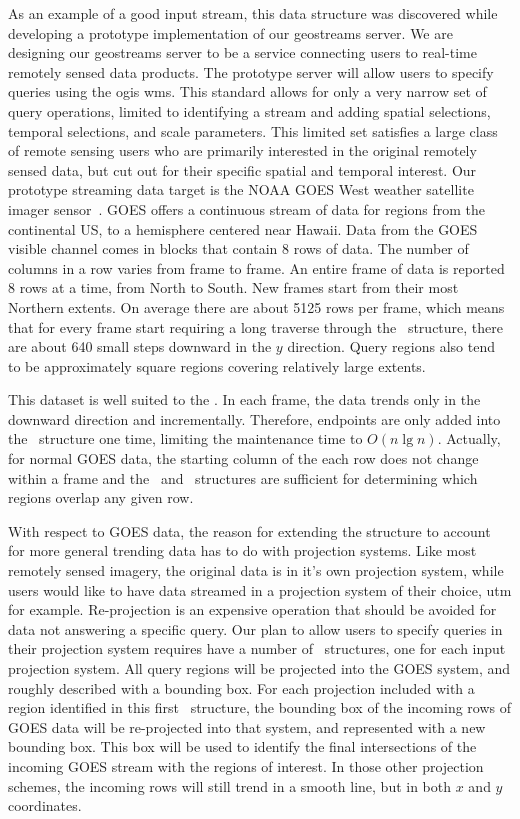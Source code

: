\documentclass{sig-alternate}
\newcommand{\ct}{\id{DCT}}
\newcommand{\inC}[1]{{\id{DCT_{#1}}}}
\newcommand{\X}{{\inC{X}}}
\newcommand{\Y}{{\inC{Y}}}
\newcommand{\A}{{\inC{A}}}
\begin{document}
As an example of a good input stream, this data structure was
discovered while developing a prototype implementation of our
geostreams server.  We are designing our geostreams server to be a
service connecting users to real-time remotely sensed data products.
The prototype server will allow users to specify queries using the
\ac{ogis} \acl{wms}.  This standard allows for only a very narrow set
of query operations, limited to identifying a stream and adding
spatial selections, temporal selections, and scale parameters. This
limited set satisfies a large class of remote sensing users who are
primarily interested in the original remotely sensed data, but cut out
for their specific spatial and temporal interest.  Our prototype
streaming data target is the \ac{NOAA} \ac{GOES} West weather satellite imager
sensor~\cite{noaa-goes}.  \ac{GOES} offers a continuous stream of data for
regions from the continental US, to a hemisphere centered near Hawaii.
Data from the \ac{GOES} visible channel comes in blocks that contain 8 rows
of data.  The number of columns in a row varies from frame to frame.
An entire frame of data is reported 8 rows at a time, from North to
South.  New frames start from their most Northern extents.  On average
there are about 5125 rows per frame, which means that for every frame
start requiring a long traverse through the \ct\ structure, there are
about 640 small steps downward in the $y$ direction.  Query regions
also tend to be approximately square regions covering relatively large
extents.

This dataset is well suited to the \ct.  In each frame, the data
trends only in the downward direction and incrementally.  Therefore,
endpoints are only added into the \X\ structure one time, limiting the
maintenance time to $O(n\lg{n})$.  Actually, for normal \ac{GOES} data, the
starting column of the each row does not change within a frame and the
\Y\ and \A\ structures are sufficient for determining which regions
overlap any given row.

With respect to \ac{GOES} data, the reason for extending the structure to
account for more general trending data has to do with projection
systems.  Like most remotely sensed imagery, the original data is in
it's own projection system, while users would like to have data
streamed in a projection system of their choice, \ac{utm} for example.
Re-projection is an expensive operation that should be avoided for
data not answering a specific query.  Our plan to allow users to
specify queries in their projection system requires have a number of
\ct\ structures, one for each input projection system.  All query
regions will be projected into the \ac{GOES} system, and roughly described
with a bounding box.  For each projection included with a region
identified in this first \ct\ structure, the bounding box of the
incoming rows of \ac{GOES} data will be re-projected into that system, and
represented with a new bounding box.  This box will be used to
identify the final intersections of the incoming \ac{GOES} stream with the
regions of interest.  In those other projection schemes, the incoming
rows will still trend in a smooth line, but in both $x$ and $y$
coordinates.
\end{document}
